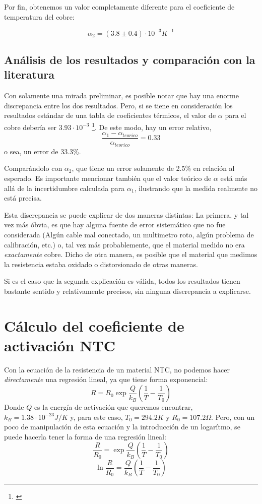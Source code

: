 \documentclass[a4paper,12pt]{article}
\begin{document}
Por fin, obtenemos un valor completamente diferente para el coeficiente de temperatura del cobre:
\begin{tcolorbox}
    \begin{equation}
        \alpha_2 = (3.8 \pm 0.4) \cdot 10^{-3} K^{-1}
    \end{equation}
\end{tcolorbox}
\subsection{Análisis de los resultados y comparación con la literatura}
Con solamente una mirada preliminar, es posible notar que hay una enorme discrepancia entre los dos resultados. Pero, si se tiene en consideración los resultados estándar de una tabla de coeficientes térmicos, el valor de $\alpha$ para el cobre debería ser $3.93\cdot 10^{-3}$ \footnote{\cite[847]{Tipler}}. De este modo, hay un error relativo, $$\frac{\alpha_1 - \alpha_{teorico}}{\alpha_{teorico}} =0.33$$ o sea, un error de 33.3\%.

Comparándolo con $\alpha_2$, que tiene un error solamente de 2.5\% en relación al esperado. Es importante mencionar también que el valor teórico de $\alpha$ está más allá de la incertidumbre calculada para $\alpha_1$, ilustrando que la medida realmente no está precisa.

Esta discrepancia se puede explicar de dos maneras distintas: La primera, y tal vez más óbvia, es que hay alguna fuente de error sistemático que no fue considerada (Algún cable mal conectado, un multimetro roto, algún problema de calibración, etc.) o, tal vez más probablemente, que el material medido no era \textit{exactamente} cobre. Dicho de otra manera, es posible que el material que medimos la resistencia estaba oxidado o distorsionado de otras maneras.

Si es el caso que la segunda explicación es válida, todos los resultados tienen bastante sentido y relativamente precisos, sin ninguna discrepancia a explicarse.

\section{Cálculo del coeficiente de activación NTC}
Con la ecuación de la resistencia de un material NTC, no podemos hacer \textit{directamente} una regresión lineal, ya que tiene forma exponencial:
$$R = R_0 \exp{\frac{Q}{k_B}\left( \frac{1}{T}-\frac{1}{T_0} \right)}$$
Donde $Q$ es la energía de activación que queremos encontrar, $k_B = 1.38\cdot 10^{-23}J/K$ y, para este caso, $T_0 = 294.2 K$ y $R_0 = 107.2 \Omega$.
Pero, con un poco de manipulación de esta ecuación y la introducción de un logarítmo, se puede hacerla tener la forma de una regresión lineal:
$$\frac{R}{R_0} = \exp{\frac{Q}{k_B}\left( \frac{1}{T}-\frac{1}{T_0} \right)}$$
$$\ln{\frac{R}{R_0}} = \frac{Q}{k_B}\left( \frac{1}{T}-\frac{1}{T_0} \right) $$
\end{document}

